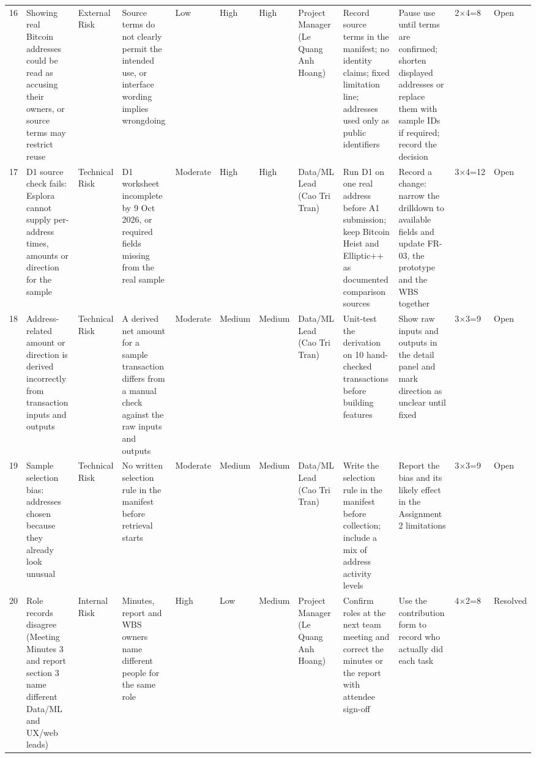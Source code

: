 \begin{landscape}
{\begin{xltabular}{\linewidth}{@{}L{0.65cm} Z L{1.85cm} Z L{1.45cm} L{1.3cm} L{1.6cm} L{2.0cm} Z Z L{1.25cm} L{1.4cm}@{}}
16 & Showing real Bitcoin addresses could be read as accusing their owners, or source terms may restrict reuse & External Risk & Source terms do not clearly permit the intended use, or interface wording implies wrongdoing & Low & High & High & Project Manager (Le Quang Anh Hoang) & Record source terms in the manifest; no identity claims; fixed limitation line; addresses used only as public identifiers & Pause use until terms are confirmed; shorten displayed addresses or replace them with sample IDs if required; record the decision & 2×4=8 & Open \\
17 & D1 source check fails: Esplora cannot supply per-address times, amounts or direction for the sample & Technical Risk & D1 worksheet incomplete by 9 Oct 2026, or required fields missing from the real sample & Moderate & High & High & Data/\allowbreak{}ML Lead (Cao Tri Tran) & Run D1 on one real address before A1 submission; keep Bitcoin Heist and Elliptic++ as documented comparison sources & Record a change: narrow the drilldown to available fields and update FR-03, the prototype and the WBS together & 3×4=12 & Open \\
18 & Address-related amount or direction is derived incorrectly from transaction inputs and outputs & Technical Risk & A derived net amount for a sample transaction differs from a manual check against the raw inputs and outputs & Moderate & Medium & Medium & Data/\allowbreak{}ML Lead (Cao Tri Tran) & Unit-test the derivation on 10 hand-checked transactions before building features & Show raw inputs and outputs in the detail panel and mark direction as unclear until fixed & 3×3=9 & Open \\
19 & Sample selection bias: addresses chosen because they already look unusual & Technical Risk & No written selection rule in the manifest before retrieval starts & Moderate & Medium & Medium & Data/\allowbreak{}ML Lead (Cao Tri Tran) & Write the selection rule in the manifest before collection; include a mix of address activity levels & Report the bias and its likely effect in the Assignment 2 limitations & 3×3=9 & Open \\
20 & Role records disagree (Meeting Minutes 3 and report section 3 name different Data/\allowbreak{}ML and UX/web leads) & Internal Risk & Minutes, report and WBS owners name different people for the same role & High & Low & Medium & Project Manager (Le Quang Anh Hoang) & Confirm roles at the next team meeting and correct the minutes or the report with attendee sign-off & Use the contribution form to record who actually did each task & 4×2=8 & Resolved \\

\end{xltabular}}
\end{landscape}
